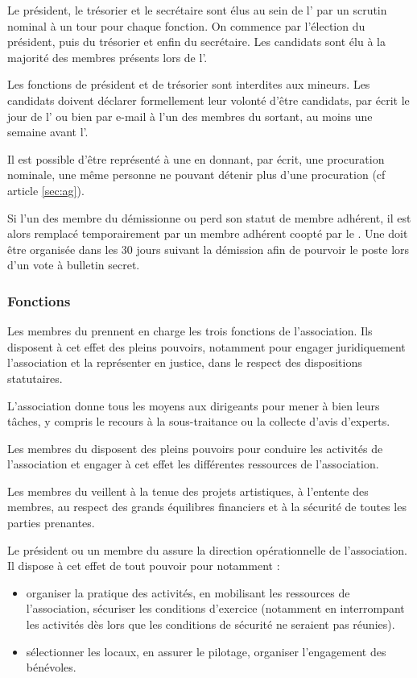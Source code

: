 \documentclass[a4paper,french,10pt]{article}
\newcounter{article}
\newcommand{\artref}[1]{article \ref{#1}}
\begin{document}
Le président, le trésorier et le secrétaire sont élus au sein de l'\AG{} par un scrutin nominal à un tour pour chaque fonction. On commence par l'élection du président, puis du trésorier et enfin du secrétaire.  Les candidats sont élu à la majorité des membres présents lors de l'\AG{}.

Les fonctions de président et de trésorier sont interdites aux mineurs. Les candidats doivent déclarer formellement leur volonté d'être candidats, par écrit le jour de l'\AG{} ou bien par e-mail à l'un des membres du \bureau{} sortant, au moins une semaine avant l'\AG{}.


Il est possible d’être représenté à une \AG{} en donnant, par écrit, une procuration nominale, une même personne ne pouvant détenir plus
d’une procuration (cf \artref{sec:ag}).

Si l'un des membre du \bureau{} démissionne ou perd son statut de membre adhérent, il est alors remplacé temporairement par un membre adhérent coopté par le \bureau{}. Une \AGE{} doit être organisée dans les 30 jours suivant la démission afin de pourvoir le poste lors d'un vote à bulletin secret.

\subsubsection*{Fonctions}
\label{sec:fonctions}

Les membres du \bureau{} prennent en charge les trois fonctions de
l’association.  Ils disposent à cet effet des pleins pouvoirs,
notamment pour engager juridiquement l’association et la représenter
en justice, dans le respect des dispositions statutaires.

L’association donne tous les moyens aux dirigeants pour mener à bien
leurs tâches, y compris le recours à la sous-traitance ou la collecte
d’avis d’experts.

Les membres du \bureau{} disposent des pleins pouvoirs pour conduire les
activités de l’association et engager à cet effet les différentes
ressources de l’association.

Les membres du \bureau{} veillent à la tenue des projets artistiques, à
l'entente des membres, au respect des grands équilibres financiers
et à la sécurité de toutes les parties prenantes.  


Le président ou un membre du \bureau{} assure la direction opérationnelle de
l’association. Il dispose à cet effet de tout pouvoir pour notamment :
\begin{itemize}
\item organiser la pratique des activités, en mobilisant les ressources de l’association, sécuriser les conditions d’exercice (notamment en interrompant les activités dès lors que les conditions de sécurité ne seraient pas réunies).
\item sélectionner les locaux, en assurer le pilotage, organiser l’engagement des bénévoles.
\end{itemize}
\end{document}
